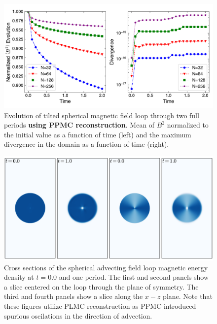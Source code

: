 \documentclass[modern, linenumbers]{aastex631}
\newcommand*{\img}[1]{%
    \raisebox{-.05\baselineskip}{%
        \texttt{[image: \#1]}%
    }%
}
\begin{document}
\begin{figure}[ht!]
    \includegraphics[width=\linewidth]{afl.pdf}
    \caption{Evolution of tilted spherical magnetic field loop through two full periods \textbf{using PPMC reconstruction}. Mean of $B^2$ normalized to the initial value as a function of time (left) and the maximum divergence in the domain as a function of time (right). \href{https://zenodo.org/records/10927223}{\img{zenodo-gradient-200.png}}}
    \label{fig:afl}
\end{figure}

\begin{figure}[ht!]
    \includegraphics[width=\linewidth]{afl_slices.pdf}
    \caption{Cross sections of the spherical advecting field loop magnetic energy density at $t=0.0$ and one period. The first and second panels show a slice centered on the loop through the plane of symmetry. The third and fourth panels show a slice along the $x-z$ plane. Note that these figures utilize PLMC reconstruction as PPMC introduced spurious oscilations in the direction of advection. \href{https://zenodo.org/records/10927223}{\img{zenodo-gradient-200.png}}}
    \label{fig:afl_slice}
\end{figure}
\end{document}
